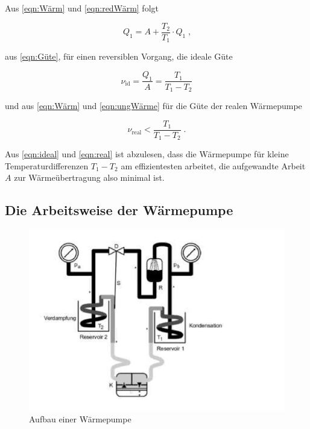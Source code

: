 Aus \ref{eqn:Wärm}  und \ref{eqn:redWärm} folgt

\begin{equation*}
    Q_1 = A + \frac{T_2}{T_1} \cdot Q_1 \; \text{,}
\end{equation*}

aus \ref{eqn:Güte}, für einen reversiblen Vorgang, die ideale Güte

\begin{equation}
    \nu_\text{id} = \frac{Q_1}{A} = \frac{T_1}{T_1 - T_2}
    \label{eqn:ideal}
\end{equation}

und aus \ref{eqn:Wärm} und \ref{eqn:ungWärme} für die Güte der realen Wärmepumpe

\begin{equation}
    \nu_\text{real} < \frac{T_1}{T_1 - T_2} \; \text{.}
    \label{eqn:real}
\end{equation}

Aus \ref{eqn:ideal} und \ref{eqn:real} ist abzulesen, dass die Wärmepumpe 
für kleine Temperaturdifferenzen $T_1 - T_2$ am effizientesten arbeitet, 
die aufgewandte Arbeit $A$ zur Wärmeübertragung also minimal ist.

\subsection{Die Arbeitsweise der Wärmepumpe}

\begin{figure}
      \centering
      \includegraphics[width=\textwidth]{aufbau2.pdf}
      \caption{Aufbau einer Wärmepumpe}
      \label{fig:aufbau2}
\end{figure}

